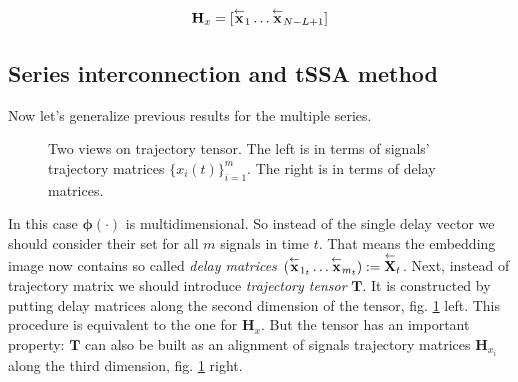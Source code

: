 	\[
		\mathbf{H}_x = [ \overset{\leftarrow}{\mathbf{x}}_{1} \ldots  \overset{\leftarrow}{\mathbf{x}}_{N - L + 1}]
	\]
	
	\subsection*{Series interconnection and tSSA method}\label{sec:tssa_method}
	
	Now let's generalize previous results for the multiple series.
	
	\begin{figure}[h]
		\centering
		
		\caption{Two views on trajectory tensor. The left is in terms of signals' trajectory matrices $ \{x_i(t)\}_{i=1}^m $. The right is in terms of delay matrices.}\label{pic:traj_tensor}
	\end{figure}
	
	In this case $ \boldsymbol{\phi}(\cdot) $ is multidimensional. So instead of the single delay vector we should consider their set for all $ m $ signals in time $ t $. That means the embedding image now contains so called \emph{delay matrices} $ ( \overset{\leftarrow}{\mathbf{x}}_{1_t} \ldots \overset{\leftarrow}{\mathbf{x}}_{m_t} ) := \overset{\leftarrow}{\mathbf{X}}_{t} $. Next, instead of trajectory matrix we should introduce \textit{trajectory tensor} $ \mathbf{T} $. It is constructed  by putting delay matrices along the second dimension of the tensor, fig. \ref{pic:traj_tensor} left. This procedure is equivalent to the one for $ \mathbf{H}_x $. But the tensor has an important property: $ \mathbf{T} $ can also be built as an alignment of signals trajectory matrices $ \mathbf{H}_{x_i} $ along the third dimension, fig. \ref{pic:traj_tensor} right.
	
